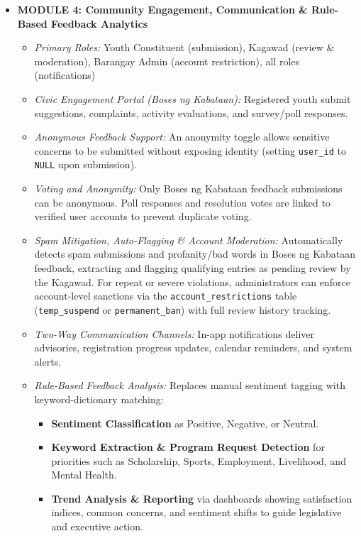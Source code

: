 \begin{itemize}
\item \textbf{MODULE 4: Community Engagement, Communication \& Rule-Based Feedback Analytics}
    \begin{itemize}
        \item \textit{Primary Roles:} Youth Constituent (submission), Kagawad (review \& moderation), Barangay Admin (account restriction), all roles (notifications)
        \item \textit{Civic Engagement Portal (Boses ng Kabataan):} Registered youth submit suggestions, complaints, activity evaluations, and survey/poll responses.
        \item \textit{Anonymous Feedback Support:} An anonymity toggle allows sensitive concerns to be submitted without exposing identity (setting \texttt{user\_id} to \texttt{NULL} upon submission).
        \item \textit{Voting and Anonymity:} Only Boses ng Kabataan feedback submissions can be anonymous. Poll responses and resolution votes are linked to verified user accounts to prevent duplicate voting.
        \item \textit{Spam Mitigation, Auto-Flagging \& Account Moderation:} Automatically detects spam submissions and profanity/bad words in Boses ng Kabataan feedback, extracting and flagging qualifying entries as pending review by the Kagawad. For repeat or severe violations, administrators can enforce account-level sanctions via the \texttt{account\_restrictions} table (\texttt{temp\_suspend} or \texttt{permanent\_ban}) with full review history tracking.
        \item \textit{Two-Way Communication Channels:} In-app notifications deliver advisories, registration progress updates, calendar reminders, and system alerts.
        \item \textit{Rule-Based Feedback Analysis:} Replaces manual sentiment tagging with keyword-dictionary matching:
        \begin{itemize}
            \item \textbf{Sentiment Classification} as Positive, Negative, or Neutral.
            \item \textbf{Keyword Extraction \& Program Request Detection} for priorities such as Scholarship, Sports, Employment, Livelihood, and Mental Health.
            \item \textbf{Trend Analysis \& Reporting} via dashboards showing satisfaction indices, common concerns, and sentiment shifts to guide legislative and executive action.
        \end{itemize}
    \end{itemize}


\end{itemize}
